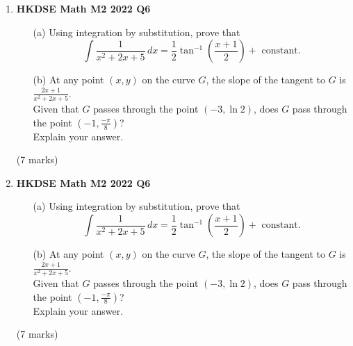 \documentclass{report}
\begin{document}
\begin{enumerate}
	\item \textbf{HKDSE Math M2 2022 Q6}
	\begin{enumerate}
		\item [(a)]Using integration by substitution, prove that $$\displaystyle \int \frac{1}{x^2+2x+5}\,dx = \frac{1}{2} \tan^{-1} \left(\frac{x+1}{2}\right) +\text{ constant.}$$
		\item [(b)]At any point $(x,y)$ on the curve $G$, the slope of the tangent to $G$ is $\displaystyle \frac{2x+1}{x^2+2x+5}$.\\
		Given that $G$ passes through the point $(-3, \ln{2})$, does $G$ pass through the point $\displaystyle \left(-1, \frac{-\pi}{8}\right)$? \\
		Explain your answer.
	\end{enumerate}
	(7 marks)

	\item \textbf{HKDSE Math M2 2022 Q6}
	\begin{enumerate}
		\item [(a)]Using integration by substitution, prove that $$\displaystyle \int \frac{1}{x^2+2x+5}\,dx = \frac{1}{2} \tan^{-1} \left(\frac{x+1}{2}\right) +\text{ constant.}$$
		\item [(b)]At any point $(x,y)$ on the curve $G$, the slope of the tangent to $G$ is $\displaystyle \frac{2x+1}{x^2+2x+5}$.\\
		Given that $G$ passes through the point $(-3, \ln{2})$, does $G$ pass through the point $\displaystyle \left(-1, \frac{-\pi}{8}\right)$? \\
		Explain your answer.
	\end{enumerate}
	(7 marks)

\end{enumerate}
\end{document}
